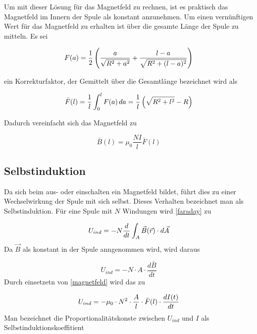 \documentclass{article}
\begin{document}
Um mit dieser Lösung für das Magnetfeld zu rechnen, ist es praktisch das Magnetfeld im Innern der Spule als konstant anzunehmen. Um einen  vernünftigen Wert für das Magnetfeld zu erhalten ist über die gesamte Länge der Spule zu mitteln. Es sei

\begin{equation}
F(a)= \frac{1}{2} \left(\frac{a}{\sqrt{R^2+a^2}}+\frac{l-a}{\sqrt{R^2+(l-a)^2}}\right)
\notag
\end{equation}

\noindent
ein Korrekturfaktor, der Gemittelt über die Gesamtlänge bezeichnet wird als

\begin{equation}
\bar{F}(l) = \frac{1}{l}\int_0^l F(a) \, da = \frac{1}{l} \left( \sqrt{R^2+l^2}-R \right)
\notag
\end{equation}

\noindent
Dadurch vereinfacht sich das Magnetfeld zu

\begin{equation}
\bar{B}(l) = \mu_0 \frac{ N I}{l} \bar{F}(l)
\label{magnetfeld_const}
\end{equation}
\subsection{Selbstinduktion}
Da sich beim aus- oder einschalten ein Magnetfeld bildet, führt dies zu einer Wechselwirkung der Spule mit sich selbst. Dieses Verhalten bezeichnet man als Selbstinduktion.
Für eine Spule mit \(N\) Windungen wird \eqref{faraday} zu

\begin{equation}
U_{ind} = - N \frac{d}{dt} \int_{A} \vec{B}(\vec{r}) \cdot d\vec{A}
\notag
\end{equation}
\noindent
Da \(\vec{B}\) als konstant in der Spule anngenommen wird, wird daraus

\begin{equation}
U_{ind} = - N \cdot A \cdot \frac{d \bar{B}}{dt} 
\label{U_ind_allg}
\end{equation}
\noindent
Durch einsetzetn von \eqref{magnetfeld} wird das zu

\begin{equation}
U_{ind} = - \mu_0 \cdot N^2 \cdot \frac{A}{l} \cdot  \bar{F}(l) \cdot \frac{dI(t)}{dt}
\notag
\end{equation}
\noindent
Man bezeichnet die Proportionalitätskonste zwischen \(U_{ind}\) und \(I\) als Selbstinduktionskoeffitient
\end{document}
